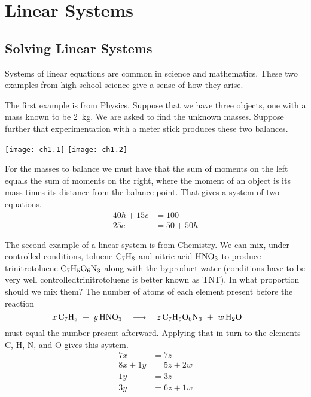 \chapter{Linear Systems}
\section{Solving Linear Systems}
Systems of linear equations are common in science and mathematics.
These two examples from high school science \cite{Onan}
give a sense of how they arise.

The first example is from Physics.
Suppose that we have three objects,
one with a mass known to be 2~kg.
We are asked to find the unknown masses.
Suppose further that
experimentation with a meter stick produces these two balances.
\begin{center}
  \texttt{[image: ch1.1]}
  \qquad
  \texttt{[image: ch1.2]}
\end{center}
For the masses to balance we must have that
the sum of moments on the left equals the sum of moments on
the right, where the moment of an object is its mass times its distance 
from the balance point. 
That gives a system of two equations.
\begin{align*}
    40h+15c  &= 100  \\
    25c      &= 50+50h
\end{align*}

The second example of a linear system 
is from Chemistry.
We can mix, under controlled conditions, toluene $\hbox{C}_7\hbox{H}_8$ and 
nitric acid $\hbox{H}\hbox{N}\hbox{O}_3$ to produce
trinitrotoluene $\hbox{C}_7\hbox{H}_5\hbox{O}_6\hbox{N}_3$
along with the byproduct water
(conditions have to be very well controlled\Dash trinitrotoluene 
is better known as TNT).
In what proportion should we mix them?
The number of atoms of each element present before the reaction
\begin{equation*}
    x\,{\rm C}_7{\rm H}_8\ +\ y\,{\rm H}{\rm N}{\rm O}_3
    \quad\longrightarrow\quad
    z\,{\rm C}_7{\rm H}_5{\rm O}_6{\rm N}_3\ +\ w\,{\rm H}_2{\rm O}
\tag*{}\end{equation*}
must equal the number present afterward.
Applying that in turn to the elements C, H, N, and O gives
this system.
\begin{align*}
      7x      &= 7z  \\
      8x +1y  &= 5z+2w  \\
      1y      &= 3z  \\
      3y      &= 6z+1w
\end{align*}


